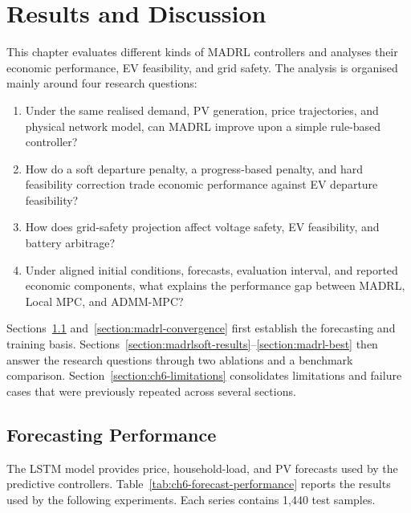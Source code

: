 
\chapter{Results and Discussion}\label{chapter:results-discussion}

This chapter evaluates different kinds of MADRL controllers and analyses their economic performance, EV feasibility, and grid safety. The analysis is organised mainly around four research questions:
\begin{enumerate}
  \item[RQ1:] Under the same realised demand, PV generation, price trajectories, and physical network model, can MADRL improve upon a simple rule-based controller?
  \item[RQ2:] How do a soft departure penalty, a progress-based penalty, and hard feasibility correction trade economic performance against EV departure feasibility?
  \item[RQ3:] How does grid-safety projection affect voltage safety, EV feasibility, and battery arbitrage?
  \item[RQ4:] Under aligned initial conditions, forecasts, evaluation interval, and reported economic components, what explains the performance gap between MADRL, Local MPC, and ADMM-MPC?
\end{enumerate}
Sections~\ref{section:lstm-price-results} and~\ref{section:madrl-convergence} first establish the forecasting and training basis. Sections~\ref{section:madrlsoft-results}--\ref{section:madrl-best} then answer the research questions through two ablations and a benchmark comparison. Section~\ref{section:ch6-limitations} consolidates limitations and failure cases that were previously repeated across several sections.

\section{Forecasting Performance}\label{section:lstm-price-results}

The LSTM model provides price, household-load, and PV forecasts used by the predictive controllers. Table~\ref{tab:ch6-forecast-performance} reports the results used by the following experiments. Each series contains 1,440 test samples.

